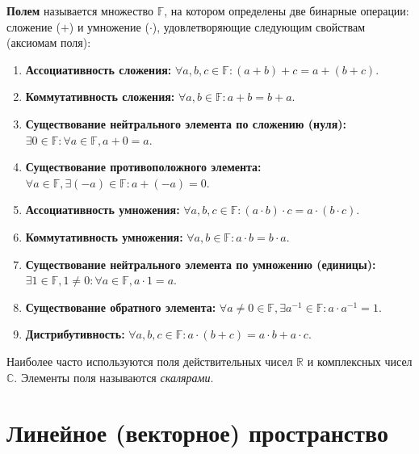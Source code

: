 \documentclass[10pt]{article}
\begin{document}
\begin{definition}
\textbf{Полем} называется множество \(\mathbb{F}\), на котором определены две бинарные операции: сложение (\(+\)) и умножение (\(\cdot\)), удовлетворяющие следующим свойствам (аксиомам поля):
\begin{enumerate}
    \item \textbf{Ассоциативность сложения:} \(\forall a,b,c \in \mathbb{F}: (a+b)+c = a+(b+c)\).
    \item \textbf{Коммутативность сложения:} \(\forall a,b \in \mathbb{F}: a+b = b+a\).
    \item \textbf{Существование нейтрального элемента по сложению (нуля):} \(\exists 0 \in \mathbb{F} : \forall a \in \mathbb{F}, a+0 = a\).
    \item \textbf{Существование противоположного элемента:} \(\forall a \in \mathbb{F}, \exists (-a) \in \mathbb{F} : a+(-a) = 0\).
    \item \textbf{Ассоциативность умножения:} \(\forall a,b,c \in \mathbb{F}: (a\cdot b)\cdot c = a\cdot(b\cdot c)\).
    \item \textbf{Коммутативность умножения:} \(\forall a,b \in \mathbb{F}: a\cdot b = b\cdot a\).
    \item \textbf{Существование нейтрального элемента по умножению (единицы):} \(\exists 1 \in \mathbb{F}, 1 \neq 0 : \forall a \in \mathbb{F}, a\cdot 1 = a\).
    \item \textbf{Существование обратного элемента:} \(\forall a \neq 0 \in \mathbb{F}, \exists a^{-1} \in \mathbb{F} : a \cdot a^{-1} = 1\).
    \item \textbf{Дистрибутивность:} \(\forall a,b,c \in \mathbb{F}: a\cdot(b+c) = a\cdot b + a\cdot c\).
\end{enumerate}
\end{definition}

Наиболее часто используются поля действительных чисел \(\mathbb{R}\) и комплексных чисел \(\mathbb{C}\). Элементы поля называются \textit{скалярами}.

\section{Линейное (векторное) пространство}
\end{document}
